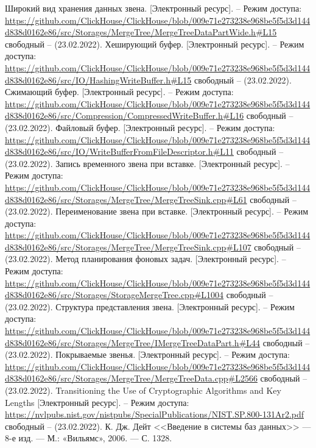 \begin{thebibliography}{}
    Широкий вид хранения данных звена. [Электронный ресурс]. – Режим доступа: \url{https://github.com/ClickHouse/ClickHouse/blob/009e71e273238e968be5f5d3d144d838d0162e86/src/Storages/MergeTree/MergeTreeDataPartWide.h#L15} свободный – (23.02.2022).
    Хеширующий буфер. [Электронный ресурс]. – Режим доступа: \url{https://github.com/ClickHouse/ClickHouse/blob/009e71e273238e968be5f5d3d144d838d0162e86/src/IO/HashingWriteBuffer.h#L15} свободный – (23.02.2022).
    Сжимающий буфер. [Электронный ресурс]. – Режим доступа: \url{https://github.com/ClickHouse/ClickHouse/blob/009e71e273238e968be5f5d3d144d838d0162e86/src/Compression/CompressedWriteBuffer.h#L16} свободный – (23.02.2022).
    Файловый буфер. [Электронный ресурс]. – Режим доступа: \url{https://github.com/ClickHouse/ClickHouse/blob/009e71e273238e968be5f5d3d144d838d0162e86/src/IO/WriteBufferFromFileDescriptor.h#L11} свободный – (23.02.2022).
    Запись временного звена при вставке. [Электронный ресурс]. – Режим доступа: \url{https://github.com/ClickHouse/ClickHouse/blob/009e71e273238e968be5f5d3d144d838d0162e86/src/Storages/MergeTree/MergeTreeSink.cpp#L61} свободный – (23.02.2022).
    Переименование звена при вставке. [Электронный ресурс]. – Режим доступа: \url{https://github.com/ClickHouse/ClickHouse/blob/009e71e273238e968be5f5d3d144d838d0162e86/src/Storages/MergeTree/MergeTreeSink.cpp#L107} свободный – (23.02.2022).
    Метод планирования фоновых задач. [Электронный ресурс]. – Режим доступа: \url{https://github.com/ClickHouse/ClickHouse/blob/009e71e273238e968be5f5d3d144d838d0162e86/src/Storages/StorageMergeTree.cpp#L1004} свободный – (23.02.2022).
    Структура представления звена. [Электронный ресурс]. – Режим доступа: \url{https://github.com/ClickHouse/ClickHouse/blob/009e71e273238e968be5f5d3d144d838d0162e86/src/Storages/MergeTree/IMergeTreeDataPart.h#L44} свободный – (23.02.2022).
    Покрываемые звенья. [Электронный ресурс]. – Режим доступа: \url{https://github.com/ClickHouse/ClickHouse/blob/009e71e273238e968be5f5d3d144d838d0162e86/src/Storages/MergeTree/MergeTreeData.cpp#L2566} свободный – (23.02.2022).
    Transitioning the Use of Cryptographic Algorithms and Key Lengths [Электронный ресурс]. – Режим доступа: \url{https://nvlpubs.nist.gov/nistpubs/SpecialPublications/NIST.SP.800-131Ar2.pdf} свободный – (23.02.2022).
    К. Дж. Дейт <<Введение в системы баз данных>> — 8-е изд. — М.: «Вильямс», 2006. — С. 1328.

\end{thebibliography}
